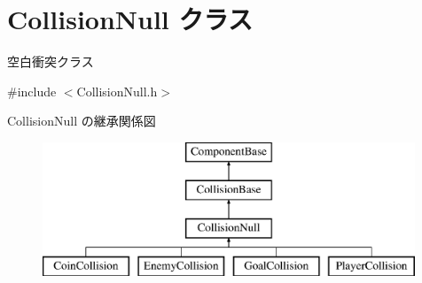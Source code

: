 \hypertarget{class_collision_null}{}\section{Collision\+Null クラス}
\label{class_collision_null}


空白衝突クラス  




{\ttfamily \#include $<$Collision\+Null.\+h$>$}

Collision\+Null の継承関係図\begin{figure}[H]
\begin{center}
\leavevmode
\includegraphics[height=4.000000cm]{class_collision_null}
\end{center}
\end{figure}
